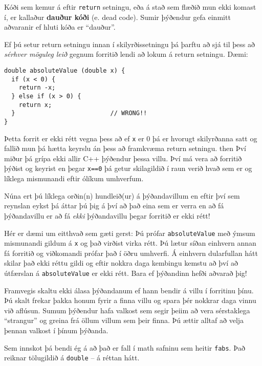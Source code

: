 Kóði sem kemur á eftir {\tt return} setningu, eða á stað sem flæðið mun ekki komast í, er kallaður {\bf dauður kóði} (e. dead code).
Sumir þýðendur gefa einmitt aðvaranir ef hluti kóða er ``dauður''.


Ef þú setur return setningu innan í skilyrðissetningu þá þarftu að sjá til þess að {\em sérhver möguleg leið} gegnum forritið lendi að lokum á return setningu.
Dæmi: 

\begin{verbatim}
double absoluteValue (double x) {
  if (x < 0) {
    return -x;
  } else if (x > 0) {
    return x;
  }                          // WRONG!!
}
\end{verbatim}
%
Þetta forrit er ekki rétt vegna þess að ef {\tt x} er 0 þá er hvorugt skilyrðanna satt og fallið mun þá hætta keyrslu án þess að framkvæma return setningu. then
Því miður þá grípa ekki allir C++ þýðendur þessa villu.
Því má vera að forritið þýðist og keyrist en þegar {\tt x==0} þá getur skilagildið í raun verið hvað sem er og líklega mismunandi eftir ólíkum umhverfum.


Núna ert þú líklega orðin(n) hundleið(ur) á þýðandavillum en eftir því sem reynslan eykst þá áttar þú þig á því 
að það eina sem er verra en að fá þýðandavillu er að fá {\em ekki} þýðandavillu þegar forritið er ekki rétt!

Hér er dæmi um eitthvað sem gæti gerst: Þú prófar {\tt absoluteValue} með ýmsum mismunandi gildum á {\tt x} og það virðist virka rétt.
Þú lætur síðan einhvern annan fá forritið og viðkomandi prófar það í öðru umhverfi.
Á einhvern dularfullan hátt skilar það ekki réttu gildi og eftir nokkra daga kembingu kemstu að því að útfærslan á {\tt absoluteValue} er ekki rétt.
Bara ef þýðandinn hefði aðvarað þig!


Framvegis skaltu ekki álasa þýðandanum ef hann bendir á villu í forritinu þínu.
Þú skalt frekar þakka honum fyrir a finna villu og spara þér nokkrar daga vinnu við aflúsun.
Sumum þýðendur hafa valkost sem segir þeiim að vera sérstaklega ``strangur'' og greina frá öllum villum sem þeir finna.
Þú ættir alltaf að velja þennan valkost í þínum þýðanda.


Sem innskot þá bendi ég á að það er fall í math safninu sem heitir {\tt fabs}.
Það reiknar tölugildið á {\tt double} -- á réttan hátt.

